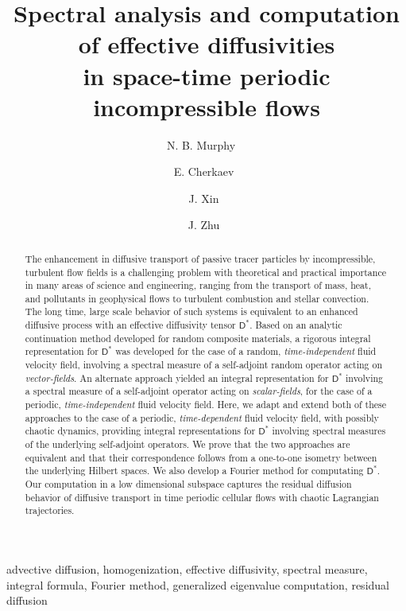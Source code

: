 \documentclass[leqno,onefignum,onetabnum]{siamltex1213}
\title{Spectral analysis and computation 
  of effective diffusivities \\in 
  space-time periodic incompressible flows  
      }
\author{
N. B. Murphy\footnotemark[1]\ \footnotemark[3]\ \footnotemark[4]
\and E. Cherkaev\footnotemark[2]\ \footnotemark[4]
\and J. Xin\footnotemark[1]\ \footnotemark[3]
\and J. Zhu\footnotemark[2]\ \footnotemark[4]%
}
\newcommand{\Dm}{\mathsf{D}}
\begin{document}
\maketitle
{}%

\begin{abstract}
The enhancement in diffusive transport of passive tracer particles by
incompressible, turbulent flow fields is a challenging problem with
theoretical and practical importance in many areas of science and
engineering, ranging from the transport of mass, heat, and pollutants
in geophysical flows to turbulent combustion and stellar
convection. The long time, large scale behavior of such systems is
equivalent to an enhanced diffusive process with an effective
diffusivity tensor $\Dm^*$. Based on an analytic continuation method
developed for random composite materials, a rigorous integral
representation for $\Dm^*$ was developed for the case of a random,
\emph{time-independent} fluid velocity field, involving a spectral
measure of a self-adjoint random operator acting on
\emph{vector-fields}. An alternate approach yielded an integral
representation for $\Dm^*$ involving a spectral measure of a
self-adjoint operator acting on \emph{scalar-fields}, for the case of
a periodic, \emph{time-independent} fluid velocity field. Here, we
adapt and extend both of these approaches to the case of a periodic,
\emph{time-dependent} fluid velocity field, with possibly chaotic
dynamics, providing integral representations for $\Dm^*$ involving
spectral measures of the underlying self-adjoint operators. We prove
that the two approaches are equivalent and that their correspondence
follows from a one-to-one isometry between the underlying Hilbert
spaces. We also develop a 
Fourier method for computating $\Dm^*$. Our
computation in a low dimensional subspace 
captures the residual diffusion behavior of diffusive transport in 
time periodic cellular flows with chaotic Lagrangian trajectories. 

%
\end{abstract}

\begin{keywords}
advective diffusion, homogenization, effective diffusivity, spectral
measure, integral formula, Fourier method, generalized eigenvalue computation, residual diffusion
\end{keywords}
\end{document}
